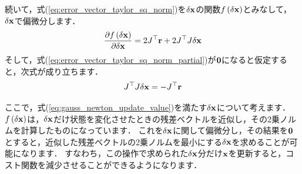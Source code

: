 続いて，式(\ref{eq:error_vector_taylor_sq_norm})を$\delta {\bf x}$の関数$f \left( \delta {\bf x} \right)$とみなして，$\delta {\bf x}$で偏微分します．
%
\begin{align}
  \frac{ \partial f \left( \delta {\bf x} \right) }{ \partial \delta {\bf x} } = 2 J^{\top} {\bf r} + 2 J^{\top} J \delta {\bf x}
  \label{eq:error_vector_taylor_sq_norm_partial}
\end{align}
%
そして，式(\ref{eq:error_vector_taylor_sq_norm_partial})が${\bf 0}$になると仮定すると，次式が成り立ちます．
%
\begin{align}
  J^{\top} J \delta {\bf x} = -J^{\top} {\bf r}
  \label{eq:gauss_newton_update_value}
\end{align}

ここで，式(\ref{eq:gauss_newton_update_value})を満たす$\delta {\bf x}$について考えます．
$f \left( \delta {\bf x} \right)$は，$\delta {\bf x}$だけ状態を変化させたときの残差ベクトルを近似し，その2乗ノルムを計算したものになっています．
これを$\delta {\bf x}$に関して偏微分し，その結果を${\bf 0}$とすると，近似した残差ベクトルの2乗ノルムを最小にする$\delta {\bf x}$を求めることが可能になります．
すなわち，この操作で求められた$\delta {\bf x}$分だけ${\bf x}$を更新すると，コスト関数を減少させることができるようになります．


